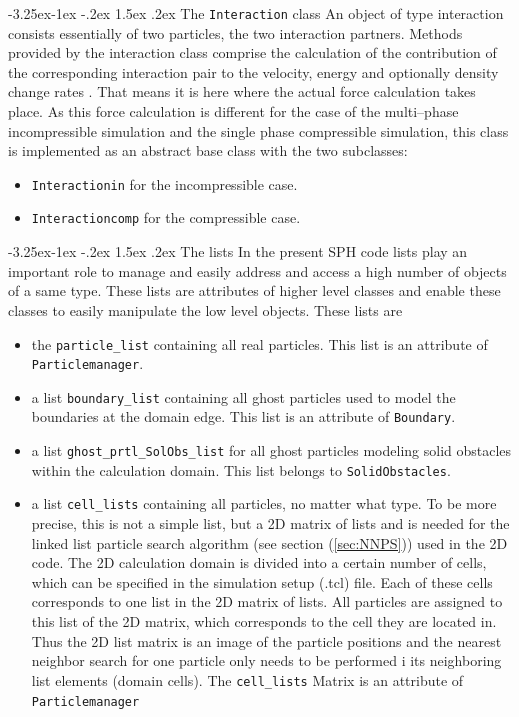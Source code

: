 \documentclass{report}
\makeatletter
\renewcommand\paragraph{\@startsection{paragraph}{4}{\z@}%
  {-3.25ex\@plus -1ex \@minus -.2ex}%
  {1.5ex \@plus .2ex}%
  {\normalfont\normalsize\bfseries}}
\makeatother
\begin{document}
\paragraph{The {\tt Interaction} class}
An object of type interaction consists essentially of two particles, the two interaction partners. Methods provided by the interaction class comprise the calculation of the contribution of the corresponding interaction pair to the velocity, energy and optionally density change rates . That means it is here where the actual force calculation takes place. 
As this force calculation is different for the case of the multi--phase incompressible simulation and the single phase compressible simulation, this class is implemented as an abstract base class with the two subclasses:
\begin{itemize}
 \item {\tt Interactionin} for the incompressible case.
 \item {\tt Interactioncomp} for the compressible case.
\end{itemize}


\paragraph{The lists}
In the present SPH code lists play an important role to manage and easily address and access a high number of objects of a same type. These lists are attributes of higher level classes and enable these classes to easily manipulate the low level objects. These lists are

\begin{itemize}
\item the {\tt particle\_list} containing all real particles. This list is an attribute of {\tt Particlemanager}.
\item a list {\tt boundary\_list} containing all ghost particles used to model the boundaries at the domain edge. This list is an attribute of {\tt Boundary}.
\item a list {\tt ghost\_prtl\_SolObs\_list} for all ghost particles modeling solid obstacles within the calculation domain. This list belongs to {\tt SolidObstacles}.
\item a list {\tt cell\_lists} containing all particles, no matter what type. To be more precise, this is not a simple list, but a 2D matrix of lists and is needed for the linked list particle search algorithm (see section (\ref{sec:NNPS})) used in the 2D code. The 2D calculation domain is divided into a certain number of cells, which can be specified in the simulation setup (.tcl) file. Each of these cells corresponds to one list in the 2D matrix of lists. All particles are assigned to this list of the 2D matrix, which corresponds to the cell they are located in. Thus the 2D list matrix is an image of the particle positions and the nearest neighbor search for one particle only needs to be performed i its neighboring list elements (domain cells). The {\tt cell\_lists} Matrix is an attribute of {\tt Particlemanager}
\end{itemize}
 
\end{document}
